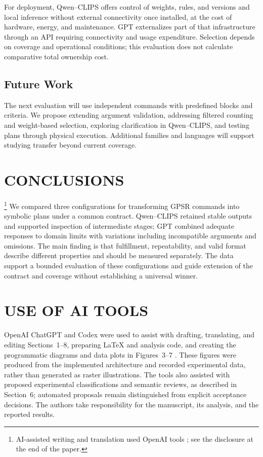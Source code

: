 \documentclass[a4paper,twoside]{article}
\begin{document}
For deployment, Qwen--CLIPS offers control of weights, rules, and versions and local inference without external connectivity once installed, at the cost of hardware, energy, and maintenance. GPT externalizes part of that infrastructure through an API requiring connectivity and usage expenditure. Selection depends on coverage and operational conditions; this evaluation does not calculate comparative total ownership cost.

\subsection{Future Work}
The next evaluation will use independent commands with predefined blocks and criteria. We propose extending argument validation, addressing filtered counting and weight-based selection, exploring clarification in Qwen--CLIPS, and testing plans through physical execution. Additional families and languages will support studying transfer beyond current coverage.

\section{CONCLUSIONS}\footnote{AI-assisted writing and translation used OpenAI tools \cite{openai_assistance}; see the disclosure at the end of the paper.}
We compared three configurations for transforming GPSR commands into symbolic plans under a common contract. Qwen--CLIPS retained stable outputs and supported inspection of intermediate stages; GPT combined adequate responses to domain limits with variations including incompatible arguments and omissions. The main finding is that fulfillment, repeatability, and valid format describe different properties and should be measured separately. The data support a bounded evaluation of these configurations and guide extension of the contract and coverage without establishing a universal winner.





\section*{USE OF AI TOOLS}
OpenAI ChatGPT and Codex were used to assist with drafting, translating, and editing Sections~1--8, preparing LaTeX and analysis code, and creating the programmatic diagrams and data plots in Figures~3--7 \cite{openai_assistance}. These figures were produced from the implemented architecture and recorded experimental data, rather than generated as raster illustrations. The tools also assisted with proposed experimental classifications and semantic reviews, as described in Section~6; automated proposals remain distinguished from explicit acceptance decisions. The authors take responsibility for the manuscript, its analysis, and the reported results.



\end{document}

